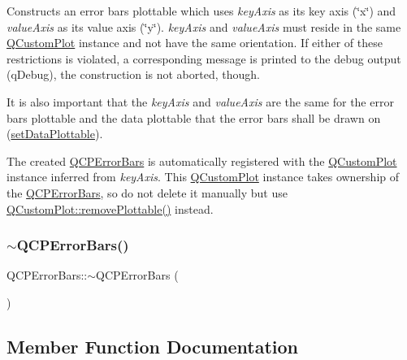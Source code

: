 Constructs an error bars plottable which uses {\itshape key\+Axis} as its key axis (\char`\"{}x\char`\"{}) and {\itshape value\+Axis} as its value axis (\char`\"{}y\char`\"{}). {\itshape key\+Axis} and {\itshape value\+Axis} must reside in the same \mbox{\hyperlink{class_q_custom_plot}{Q\+Custom\+Plot}} instance and not have the same orientation. If either of these restrictions is violated, a corresponding message is printed to the debug output (q\+Debug), the construction is not aborted, though.

It is also important that the {\itshape key\+Axis} and {\itshape value\+Axis} are the same for the error bars plottable and the data plottable that the error bars shall be drawn on (\mbox{\hyperlink{class_q_c_p_error_bars_aabb42a964cfbf780cd1c79850c7cd989}{set\+Data\+Plottable}}).

The created \mbox{\hyperlink{class_q_c_p_error_bars}{Q\+C\+P\+Error\+Bars}} is automatically registered with the \mbox{\hyperlink{class_q_custom_plot}{Q\+Custom\+Plot}} instance inferred from {\itshape key\+Axis}. This \mbox{\hyperlink{class_q_custom_plot}{Q\+Custom\+Plot}} instance takes ownership of the \mbox{\hyperlink{class_q_c_p_error_bars}{Q\+C\+P\+Error\+Bars}}, so do not delete it manually but use \mbox{\hyperlink{class_q_custom_plot_af3dafd56884208474f311d6226513ab2}{Q\+Custom\+Plot\+::remove\+Plottable()}} instead. \mbox{\label{class_q_c_p_error_bars_a7468f8c3dc1cb162d86cf392e938a2e3}} 
\subsubsection{\texorpdfstring{$\sim$QCPErrorBars()}{~QCPErrorBars()}}
{\footnotesize\ttfamily Q\+C\+P\+Error\+Bars\+::$\sim$\+Q\+C\+P\+Error\+Bars (\begin{DoxyParamCaption}{ }\end{DoxyParamCaption})\hspace{0.3cm}{\ttfamily [virtual]}}



\subsection{Member Function Documentation}
\mbox{\label{class_q_c_p_error_bars_aae296ad9817b3fa418db284af81cecf8}} 
